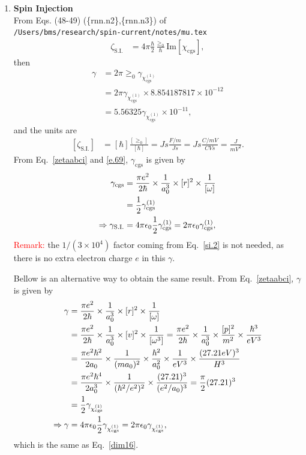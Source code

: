 \documentclass[12pt]{article}
\numberwithin{equation}{section}
\begin{document}
\begin{enumerate}
\item {\bf Spin Injection}\\
From Eqs. (48-49) (\{rnn.n2\},\{rnn.n3\}) of\\
\verb=/Users/bms/research/spin-current/notes/mu.tex=
\begin{align}\label{rnn.n2}
\zeta_{\mathrm{S.I.}}&=4\pi\frac{\hbar}{2}\frac{\ge_0}{\hbar}
\mathrm{Im}[\chi_{\mathrm{cgs}}]
,
\end{align} 
then
\begin{align}\label{dim16}
\gamma&=2\pi
\ge_0  
 \gamma_{\chi^{(1)}_{\mathrm{cgs}}} 
\nonumber\\
&=2\pi  \gamma_{\chi^{(1)}_{\mathrm{cgs}}} 
\times 8.854 187 817 \times 10^{-12}
\nonumber\\
&=5.56325  \gamma_{\chi^{(1)}_{\mathrm{cgs}}} 
\times 10^{-11}
,
\end{align}
and the units are
\begin{align}\label{rnn.n3}
[\zeta_{\mathrm{S.I.}}]&=[\hbar]\frac{[\ge_0]}{[\hbar]}
=Js 
\frac{F/m}{Js}=Js\frac{C/mV}{CVs}
=
\frac{J}{mV^2}
.
\end{align}
From Eq.~\eqref{zetaabci} and \eqref{e.69}, 
$\gamma_{\mathrm{cgs}}$ is given by 
\begin{align}\label{uzp.1}
\gamma_{\mathrm{cgs}}&=
\frac{\pi e^2}{2\hbar}\times\frac{1}{a^3_0}\times[r]^2\times\frac{1}{[\omega]}
\nonumber\\
&=
\frac{1}{2}\gamma^{(1)}_{\mathrm{cgs}} 
\nonumber\\
\Rightarrow  
\gamma_{\mathrm{S.I.}} &= 
4\pi\epsilon_0\frac{1}{2}\gamma^{(1)}_{\mathrm{cgs}}
= 
2\pi\epsilon_0\gamma^{(1)}_{\mathrm{cgs}}
,
\end{align} 
\textcolor{red}{Remark:} the $1/(3\times 10^4)$ factor coming from 
Eq.~\eqref{si.2} is not needed, as there is no extra electron charge $e$ in 
this $\gamma$. 


Bellow is an alternative way to obtain the same result.
From Eq.~\eqref{zetaabci}, $\gamma$ is given by 
\begin{align}\label{uz.1}
\gamma&=\frac{\pi e^2}{2\hbar}\times\frac{1}{a^3_0}\times[r]^2\times\frac{1}{[\omega]}
\nonumber\\
&=
\frac{\pi e^2}{2\hbar}\times\frac{1}{a^3_0}\times[v]^2\times\frac{1}{[\omega^3]}
=
\frac{\pi e^2}{2\hbar}\times\frac{1}{a^3_0}\times\frac{[p]^2}{m^2}
\times\frac{\hbar^3}{eV^3}
\nonumber\\
&=
\frac{\pi e^2\hbar^2}{2a_0}\times\frac{1}{(ma_0)^2}\times\frac{\hbar^2}{a^2_0}
\times\frac{1}{eV^3}\times \frac{(27.21eV)^3}{H^3}
\nonumber\\
&=
\frac{\pi e^2\hbar^4}{2a^3_0}\times\frac{1}{(\hbar^2/e^2)^2}
\times \frac{(27.21)^3}{(e^2/a_0)^3}
=
\frac{\pi}{2}(27.21)^3  
\nonumber\\
&=
\frac{1}{2}\gamma_{\chi^{(1)}_{\mathrm{cgs}}} 
\nonumber\\
\Rightarrow  
\gamma &=  
4\pi\epsilon_0\frac{1}{2}\gamma_{\chi^{(1)}_{\mathrm{cgs}}} 
=  
2\pi\epsilon_0\gamma_{\chi^{(1)}_{\mathrm{cgs}}} 
,
\end{align}  
which is the same as Eq.~\eqref{dim16}.


\end{enumerate}
\end{document}
